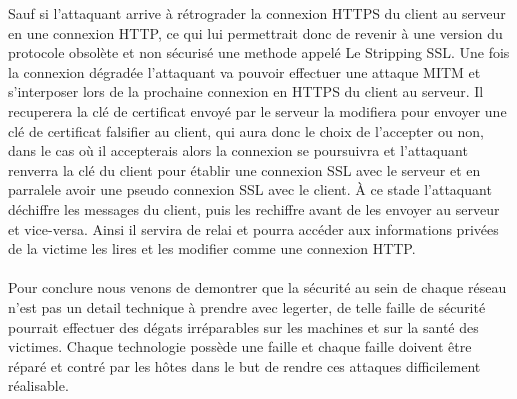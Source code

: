 \documentclass[landscape,12pt]{report}
\begin{document}
\begin{textblock}{5.3}
   Sauf si l'attaquant arrive à \textcolor{red!70}{rétrograder} la connexion HTTPS du client au serveur en une connexion HTTP, ce qui lui permettrait donc de revenir à une version du protocole obsolète et non sécurisé une methode appelé \textcolor{green!70}{Le Stripping SSL}. Une fois la connexion dégradée l'attaquant va pouvoir effectuer une attaque MITM et s'interposer lors de la prochaine connexion en HTTPS du client au serveur. Il recuperera la clé de certificat envoyé par le serveur la modifiera pour envoyer \textcolor{red!70}{une clé de certificat falsifier} au client, qui aura donc le choix de l'accepter ou non, dans le cas où il accepterais alors la connexion se poursuivra et l'attaquant renverra la clé du client pour établir une connexion SSL avec le serveur et en \textcolor{red!70}{parralele} avoir une pseudo connexion SSL avec le client. À ce stade l'attaquant déchiffre les messages du client, puis les rechiffre avant de les envoyer au serveur et vice-versa. Ainsi il servira de \textcolor{red!70}{relai} et pourra accéder aux informations privées de la victime les lires et les modifier comme une connexion HTTP.
   \\
   \\
   Pour conclure nous venons de demontrer que la \textcolor{green!70}{sécurité} au sein de chaque réseau n'est pas un detail technique à prendre avec \textcolor{red!70}{legerter}, de telle faille de sécurité pourrait effectuer des dégats irréparables sur les machines et sur la santé des victimes. Chaque technologie possède une faille et chaque faille doivent être \textcolor{red!70}{réparé et contré} par les hôtes dans le but de rendre ces attaques difficilement réalisable.  
  \end{textblock}
\end{document}
